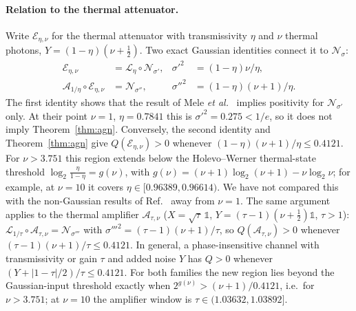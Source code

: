 \documentclass[aps,pra,reprint,superscriptaddress,nofootinbib,longbibliography,floatfix]{revtex4-2}
\theoremstyle{remark}
\newcommand{\Nsig}{\mathcal{N}_\sigma}
\newcommand{\Amp}{\mathcal{A}}
\newcommand{\Loss}{\mathcal{L}}
\begin{document}
\paragraph*{Relation to the thermal attenuator.} Write $\mathcal E_{\eta,\nu}$ for the thermal attenuator
with transmissivity $\eta$ and $\nu$ thermal photons, $Y=(1-\eta)(\nu+\frac12)$. Two exact Gaussian
identities connect it to $\Nsig$:
\begin{equation}
\begin{aligned}
  \mathcal E_{\eta,\nu}&=\Loss_\eta\circ\mathcal N_{\sigma'}, & \sigma'^2&=(1-\eta)\nu/\eta,\\
  \Amp_{1/\eta}\circ\mathcal E_{\eta,\nu}&=\mathcal N_{\sigma''}, & \sigma''^2&=(1-\eta)(\nu+1)/\eta.
\end{aligned}
  \label{eq:thermalrel}
\end{equation}
The first identity shows that the result of Mele \textit{et al.}~\cite{mele2026thermal} implies
positivity for $\mathcal N_{\sigma'}$ only. At their point $\nu=1$, $\eta=0.7841$ this is
$\sigma'^2=0.275<1/e$, so it does not imply Theorem~\ref{thm:agn}. Conversely, the second identity and
Theorem~\ref{thm:agn} give $Q(\mathcal E_{\eta,\nu})>0$ whenever $(1-\eta)(\nu+1)/\eta\le0.4121$. For
$\nu>3.751$ this region extends below the Holevo--Werner thermal-state threshold
$\log_2\frac{\eta}{1-\eta}=g(\nu)$, with $g(\nu)=(\nu+1)\log_2(\nu+1)-\nu\log_2\nu$; for example, at
$\nu=10$ it covers $\eta\in[0.96389,0.96614)$. We have not compared this with the non-Gaussian results of
Ref.~\cite{mele2026thermal} away from $\nu=1$.
The same argument applies to the thermal amplifier $\mathcal A_{\tau,\nu}$ ($X=\sqrt\tau\,\mathbb 1$,
$Y=(\tau-1)(\nu+\frac12)\mathbb 1$, $\tau>1$): $\Loss_{1/\tau}\circ\mathcal A_{\tau,\nu}=\mathcal N_{\sigma'''}$ with
$\sigma'''^2=(\tau-1)(\nu+1)/\tau$, so $Q(\mathcal A_{\tau,\nu})>0$ whenever $(\tau-1)(\nu+1)/\tau\le0.4121$. In
general, a phase-insensitive channel with transmissivity or gain $\tau$ and added noise $Y$ has $Q>0$
whenever $(Y+|1-\tau|/2)/\tau\le0.4121$. For both families the new region lies beyond the Gaussian-input
threshold exactly when $2^{g(\nu)}>(\nu+1)/0.4121$, i.e.\ for $\nu>3.751$; at $\nu=10$ the amplifier
window is $\tau\in(1.03632,1.03892]$.
\end{document}
